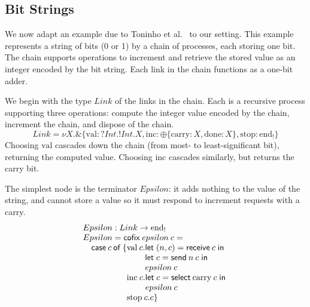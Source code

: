 \documentclass[orivec,envcountsame]{llncs}
\makeatletter
\newcommand{\with}{\mathbin\binampersand}
\newcommand{\gvout}[2]{{!#1.#2}}
\newcommand{\gvin}[2]{{?#1.#2}}
\newcommand{\outterm}{\mathrm{end}_!}
\newcommand{\mkwd}[1]{\mathsf{#1}}
\newcommand{\clabel}[1]{\mathrm{#1}}
\newcommand{\gvsend}[2]{\mkwd{send}\:#1\:#2}
\newcommand{\gvreceive}[1]{\mkwd{receive}\:#1}
\newcommand{\gvlet}[3]{\mkwd{let}\;#1 = #2\;\mkwd{in}\;#3}
\newcommand{\gvselect}[2]{\mkwd{select}\:#1\:#2}
\newcommand{\lrkwd}{\mkwd{cofix}}
\newcommand{\ba}{\begin{array}}
\newcommand{\ea}{\end{array}}
\newcommand{\bl}{\ba[t]{@{}l@{}}}
\newcommand{\el}{\ea}
\newcommand{\todo}[1]{{\noindent\small\color{red} \framebox{\parbox{\dimexpr\linewidth-2\fboxsep-2\fboxrule}{\textbf{TODO:} #1}}}}
\makeatother
\begin{document}
\subsection{Bit Strings}
%

We now adapt an example due to Toninho et al.~\cite{Toninho13} to our setting. This example
represents a string of bits (0 or 1) by a chain of processes, each storing one bit. The chain
supports operations to increment and retrieve the stored value as an integer encoded by the bit
string. Each link in the chain functions as a one-bit adder.

We begin with the type $Link$ of the links in the chain. Each is a recursive process supporting
three operations: compute the integer value encoded by the chain, increment the chain, and dispose
of the chain.
%
\[
 Link = \nu X. \with \{ \clabel{val}: \gvin{Int}{\gvout{Int}{X}},
                        \clabel{inc}: \oplus \{ \clabel{carry}: X,
                                                \clabel{done}: X \},
                        \clabel{stop}: \outterm \}
\]
Choosing $\clabel{val}$ cascades down the chain (from most- to least-significant bit), returning the
computed value. Choosing $\clabel{inc}$ cascades similarly, but returns the carry bit.

The simplest node is the terminator $Epsilon$: it adds nothing to the value of the string, and
cannot store a value so it must respond to increment requests with a carry.
\[
\bl
Epsilon : Link \to \outterm \\
Epsilon = \lrkwd\:epsilon\:c = \\
\quad \mkwd{case}\:c\:\mkwd{of}\:\{
  \bl
  \clabel{val}\:c.
    \bl
    \gvlet{(n,c)}{\gvreceive{c}}{} \\
    \gvlet{c}{\gvsend{n}{c}}{} \\
    epsilon\:c \\
    \el \\
  \clabel{inc}\:c.
    \bl
    \gvlet{c}{\gvselect{\clabel{carry}}{c}}{} \\
    epsilon\:c \\
    \el \\
  \clabel{stop}\:c. c\}  \\
  \el \\
\el
\]
\end{document}
